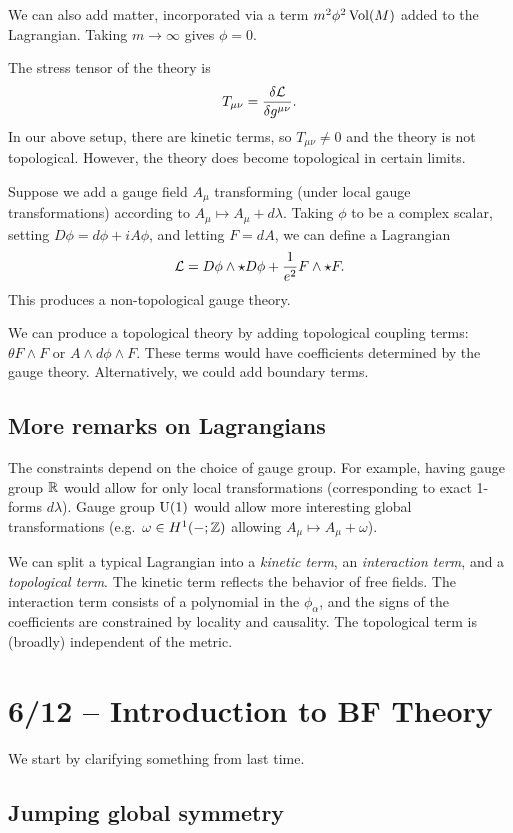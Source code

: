 We can also add matter, incorporated via a term $m^2 \phi^2 \operatorname{Vol}(M)$ added to the Lagrangian.
Taking $m \to \infty$ gives $\phi = 0$.

The stress tensor of the theory is
\[
	T_{\mu\nu} = \frac{\delta \mathcal{L}}{\delta g^{\mu\nu}}.
\]
In our above setup, there are kinetic terms, so $T_{\mu\nu} \neq 0$ and the theory is not topological.
However, the theory does become topological in certain limits.

Suppose we add a gauge field $A_\mu$ transforming (under local gauge transformations) according to $A_\mu \mapsto A_\mu + d\lambda$.
Taking $\phi$ to be a complex scalar, setting $D\phi = d\phi + i A \phi$, and letting $F = dA$, we can define a Lagrangian
\[
	\mathcal{L} = D \phi \wedge \star D\phi + \frac{1}{e^2} F \wedge \star F.
\]
This produces a non-topological gauge theory.

We can produce a topological theory by adding topological coupling terms: $\theta F \wedge F$ or $A \wedge d\phi \wedge F$.
These terms would have coefficients determined by the gauge theory.
Alternatively, we could add boundary terms.

\subsection{More remarks on Lagrangians}

The constraints depend on the choice of gauge group.
For example, having gauge group $\mathbb{R}$ would allow for only local transformations (corresponding to exact 1-forms $d \lambda$).
Gauge group $\mathrm{U}(1)$ would allow more interesting global transformations (e.g.\ $\omega \in H^1(-; \mathbb{Z})$ allowing $A_\mu \mapsto A_\mu + \omega$).

We can split a typical Lagrangian into a \emph{kinetic term}, an \emph{interaction term}, and a \emph{topological term}.
The kinetic term reflects the behavior of free fields.
The interaction term consists of a polynomial in the $\phi_\alpha$, and the signs of the coefficients are constrained by locality and causality.
The topological term is (broadly) independent of the metric.

\section{6/12 -- Introduction to BF Theory}

We start by clarifying something from last time.

\subsection{Jumping global symmetry}

